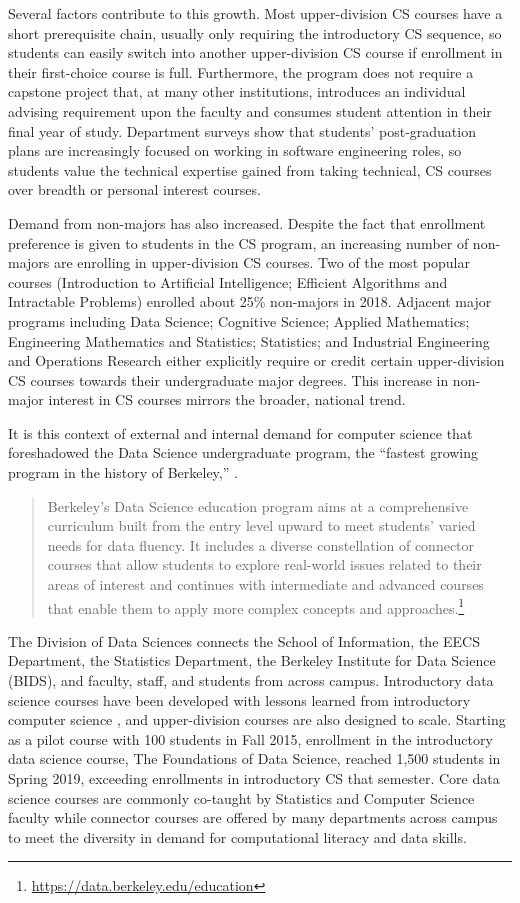 Several factors contribute to this growth. Most upper-division CS courses have a short prerequisite chain, usually only requiring the introductory CS sequence, so students can easily switch into another upper-division CS course if enrollment in their first-choice course is full. Furthermore, the program does not require a capstone project that, at many other institutions, introduces an individual advising requirement upon the faculty and consumes student attention in their final year of study. Department surveys show that students' post-graduation plans are increasingly focused on working in software engineering roles, so students value the technical expertise gained from taking technical, CS courses over breadth or personal interest courses.

Demand from non-majors has also increased. Despite the fact that enrollment preference is given to students in the CS program, an increasing number of non-majors are enrolling in upper-division CS courses. Two of the most popular courses (Introduction to Artificial Intelligence; Efficient Algorithms and Intractable Problems) enrolled about 25\% non-majors in 2018. Adjacent major programs including Data Science; Cognitive Science; Applied Mathematics; Engineering Mathematics and Statistics; Statistics; and Industrial Engineering and Operations Research either explicitly require or credit certain upper-division CS courses towards their undergraduate major degrees. This increase in non-major interest in CS courses mirrors the broader, national trend.

It is this context of external and internal demand for computer science that foreshadowed the Data Science undergraduate program, the ``fastest growing program in the history of Berkeley,'' \cite{Alivisatos:2017}.
\begin{quote}
    Berkeley's Data Science education program aims at a comprehensive curriculum built from the entry level upward to meet students' varied needs for data fluency. It includes a diverse constellation of connector courses that allow students to explore real-world issues related to their areas of interest and continues with intermediate and advanced courses that enable them to apply more complex concepts and approaches.\footnote{\url{https://data.berkeley.edu/education}}
\end{quote}
The Division of Data Sciences connects the School of Information, the EECS Department, the Statistics Department, the Berkeley Institute for Data Science (BIDS), and faculty, staff, and students from across campus. Introductory data science courses have been developed with lessons learned from introductory computer science \cite{Swamy:2018}, and upper-division courses are also designed to scale. Starting as a pilot course with 100 students in Fall 2015, enrollment in the introductory data science course, The Foundations of Data Science, reached 1,500 students in Spring 2019, exceeding enrollments in introductory CS that semester. Core data science courses are commonly co-taught by Statistics and Computer Science faculty while connector courses are offered by many departments across campus to meet the diversity in demand for computational literacy and data skills.

